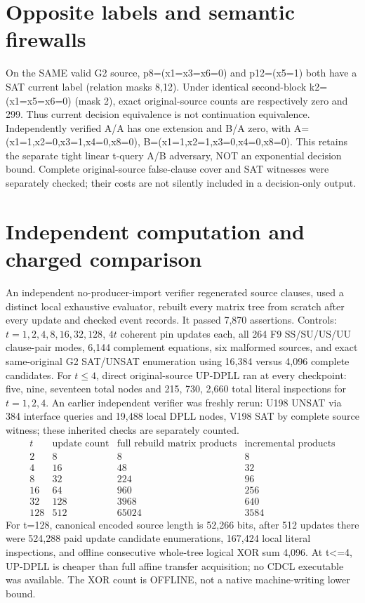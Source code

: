 \documentclass[11pt]{article}
\begin{document}
\section{Opposite labels and semantic firewalls}
On the SAME valid G2 source, p8=(x1=x3=x6=0) and p12=(x5=1) both have a SAT current label (relation masks 8,12). Under identical second-block k2=(x1=x5=x6=0) (mask 2), exact original-source counts are respectively zero and 299. Thus current decision equivalence is not continuation equivalence. Independently verified A/A has one extension and B/A zero, with A=(x1=1,x2=0,x3=1,x4=0,x8=0), B=(x1=1,x2=1,x3=0,x4=0,x8=0). This retains the separate tight linear t-query A/B adversary, NOT an exponential decision bound. Complete original-source false-clause cover and SAT witnesses were separately checked; their costs are not silently included in a decision-only output.
\section{Independent computation and charged comparison}
An independent no-producer-import verifier regenerated source clauses, used a distinct local exhaustive evaluator, rebuilt every matrix tree from scratch after every update and checked event records. It passed 7,870 assertions. Controls: $t=1,2,4,8,16,32,128$, $4t$ coherent pin updates each, all 264 F9 SS/SU/US/UU clause-pair modes, 6,144 complement equations, six malformed sources, and exact same-original G2 SAT/UNSAT enumeration using 16,384 versus 4,096 complete candidates. For $t\le4$, direct original-source UP-DPLL ran at every checkpoint: five, nine, seventeen total nodes and 215, 730, 2,660 total literal inspections for $t=1,2,4$. An earlier independent verifier was freshly rerun: U198 UNSAT via 384 interface queries and 19,488 local DPLL nodes, V198 SAT by complete source witness; these inherited checks are separately counted.
\[
\begin{array}{r|rrr}
t&\text{update count}&\text{full rebuild matrix products}&\text{incremental products}\\\hline
2&8&8&8\\4&16&48&32\\8&32&224&96\\16&64&960&256\\
32&128&3968&640\\128&512&65024&3584
\end{array}
\]
For t=128, canonical encoded source length is 52,266 bits, after 512 updates there were 524,288 paid update candidate enumerations, 167,424 local literal inspections, and offline consecutive whole-tree logical XOR sum 4,096. At t<=4, UP-DPLL is cheaper than full affine transfer acquisition; no CDCL executable was available. The XOR count is OFFLINE, not a native machine-writing lower bound.
\end{document}
